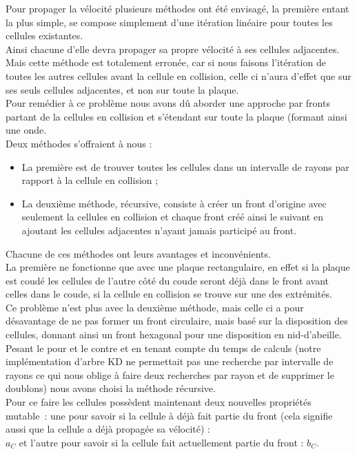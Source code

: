 \documentclass[a4paper,11pt]{article}
\begin{document}
Pour propager la vélocité plusieurs méthodes ont été envisagé, la première entant la plus simple, se compose simplement d'une itération linéaire pour toutes les cellules existantes.\\
Ainsi chacune d'elle devra propager sa propre vélocité à ses cellules adjacentes.\\
Mais cette méthode est totalement erronée, car si nous faisons l'itération de toutes les autres cellules avant la cellule en collision, celle ci n'aura d'effet que sur ses seuls cellules adjacentes, et non sur toute la plaque.\\
Pour remédier à ce problème nous avons dû aborder une approche par fronts partant de la cellules en collision et s'étendant sur toute la plaque (formant ainsi une onde.\\
Deux méthodes s'offraient à nous :
\begin{itemize}
\item La première est de trouver toutes les cellules dans un intervalle de rayons par rapport à la cellule en collision ;
\item La deuxième méthode, récursive, consiste à créer un front d'origine avec seulement la cellules en collision et chaque front créé ainsi le suivant en ajoutant les cellules adjacentes n'ayant jamais participé au front.
\end{itemize}
Chacune de ces méthodes ont leurs avantages et inconvénients.\\
La première ne fonctionne que avec une plaque rectangulaire, en effet si la plaque est coudé les cellules de l'autre côté du coude seront déjà dans le front avant celles dans le coude, si la cellule en collision se trouve sur une des extrémités.\\
Ce problème n'est plus avec la deuxième méthode, mais celle ci a pour désavantage de ne pas former un front circulaire, mais basé sur la disposition des cellules, donnant ainsi un front hexagonal pour une disposition en nid-d'abeille.\\
Pesant le pour et le contre et en tenant compte du temps de calculs (notre implémentation d'arbre KD ne permettait pas une recherche par intervalle de rayons ce qui nous oblige à faire deux recherches par rayon et de supprimer le doublons) nous avons choisi la méthode récursive.\\
Pour ce faire les cellules possèdent maintenant deux nouvelles propriétés mutable~: une pour savoir si la cellule à déjà fait partie du front (cela signifie aussi que la cellule a déjà propagée sa vélocité) :\\ $a_C$ et l'autre pour savoir si la cellule fait actuellement partie du front : $b_C$.\\
\end{document}
